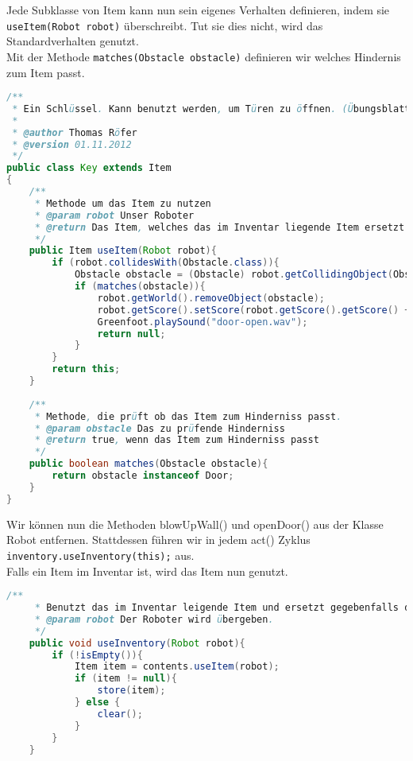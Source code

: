 \documentclass{pi1}
\begin{document}
Jede Subklasse von Item kann nun sein eigenes Verhalten definieren, indem sie \texttt{useItem(Robot robot)} überschreibt. Tut sie dies nicht, wird das Standardverhalten genutzt.\\
Mit der Methode \texttt{matches(Obstacle obstacle)} definieren wir welches Hindernis zum Item passt.

\begin{lstlisting}[caption={Klasse \emph{Key}}, firstnumber=1, language=Java]
/**
 * Ein Schlüssel. Kann benutzt werden, um Türen zu öffnen. (Übungsblatt 3)
 * 
 * @author Thomas Röfer 
 * @version 01.11.2012
 */
public class Key extends Item
{
    /**
     * Methode um das Item zu nutzen
     * @param robot Unser Roboter
     * @return Das Item, welches das im Inventar liegende Item ersetzt
     */
    public Item useItem(Robot robot){
        if (robot.collidesWith(Obstacle.class)){
            Obstacle obstacle = (Obstacle) robot.getCollidingObject(Obstacle.class);
            if (matches(obstacle)){
                robot.getWorld().removeObject(obstacle);
                robot.getScore().setScore(robot.getScore().getScore() + 100);
                Greenfoot.playSound("door-open.wav");
                return null;
            }
        }
        return this;
    }
    
    /**
     * Methode, die prüft ob das Item zum Hinderniss passt.
     * @param obstacle Das zu prüfende Hinderniss
     * @return true, wenn das Item zum Hinderniss passt
     */
    public boolean matches(Obstacle obstacle){   
        return obstacle instanceof Door;
    }
}
\end{lstlisting}

Wir können nun die Methoden blowUpWall() und openDoor() aus der Klasse Robot entfernen. Stattdessen führen wir in jedem act() Zyklus \texttt{inventory.useInventory(this);} aus.
\\
Falls ein Item im Inventar ist, wird das Item nun genutzt.

\begin{lstlisting}[caption={Klasse \emph{Inventory}, Methode \emph{useInventory}}, firstnumber=67, language=Java]
/**
     * Benutzt das im Inventar leigende Item und ersetzt gegebenfalls das Item
     * @param robot Der Roboter wird übergeben.
     */
    public void useInventory(Robot robot){
        if (!isEmpty()){
            Item item = contents.useItem(robot);
            if (item != null){
                store(item);
            } else {
                clear();
            }
        }
    }
\end{lstlisting}
\end{document}
